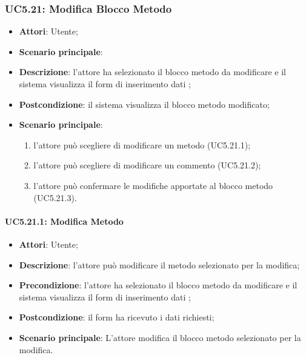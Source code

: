\subsubsection{UC5.21: Modifica Blocco Metodo}
\label{UC5.21}
\begin{itemize}
\item \textbf{Attori}: Utente;\item \textbf{Scenario principale}:

\item \textbf{Descrizione}: l'attore ha selezionato il blocco metodo da modificare e il sistema visualizza il form di inserimento dati ;	
\item \textbf{Postcondizione}: il sistema visualizza il blocco metodo modificato;	
\item \textbf{Scenario principale}:
\begin{enumerate}
\item l'attore può scegliere di modificare un metodo (UC5.21.1);
\item l'attore può scegliere di modificare un commento (UC5.21.2);
\item l'attore può confermare le modifiche apportate al blocco metodo (UC5.21.3).
\end{enumerate}
\end{itemize}
\paragraph{UC5.21.1: Modifica Metodo}
\label{UC5.21.1}
\begin{itemize}
\item \textbf{Attori}: Utente;
\item \textbf{Descrizione}: l'attore può modificare il metodo selezionato per la modifica;
\item \textbf{Precondizione}: l'attore ha selezionato il blocco metodo da modificare e il sistema visualizza il form di inserimento dati ;	
\item \textbf{Postcondizione}: il form ha ricevuto i dati richiesti;	
\item \textbf{Scenario principale}:
L'attore modifica il blocco metodo selezionato per la modifica.	
\end{itemize}
